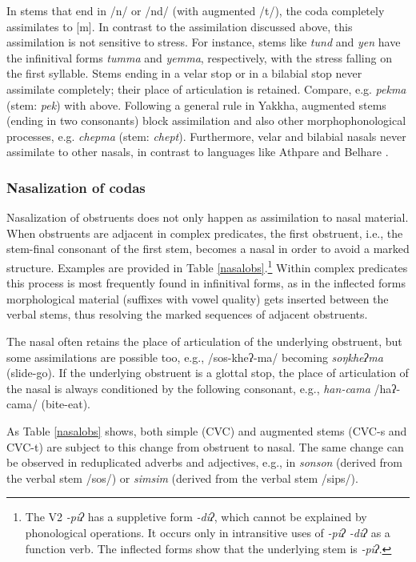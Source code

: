 In stems that end in /n/ or /nd/ (with augmented /t/), the coda completely assimilates to [m]. In contrast to the assimilation discussed above, this assimilation is not sensitive to stress. For instance, stems like \emph{tund}  and \emph{yen}  have the infinitival forms \emph{tumma} and \emph{yemma}, respectively, with the stress falling on the first syllable. Stems ending in a velar stop or in a bilabial stop never assimilate completely; their place of articulation is retained. Compare, e.g. \emph{pekma}  (stem: \emph{pek}) with \Last[b] above. Following a general rule in Yakkha, augmented stems (ending in two consonants) block assimilation and also other morphophonological processes, e.g. \emph{chepma}  (stem: \emph{chept}). Furthermore, velar and bilabial nasals never assimilate to other nasals, in contrast to languages like Athpare and  Belhare \citep{Ebert1997A-grammar, Bickel2003Belhare}.


\subsubsection{Nasalization of codas}\label{nas-cod}

Nasalization of obstruents does not only happen as assimilation to nasal material. When obstruents are adjacent in complex predicates, the first obstruent, i.e., the stem-final consonant of the first stem, becomes a nasal in order to avoid a marked structure. Examples are provided in  Table \ref{nasalobs}.\footnote{The V2 \emph{-piʔ} has a suppletive form \emph{-diʔ}, which cannot be explained by phonological operations. It occurs only in intransitive uses of \emph{-piʔ \ti -diʔ}  as a function verb. The inflected forms show that the underlying stem is \emph{-piʔ}.} Within complex predicates this process is most frequently found in infinitival forms, as in the inflected forms morphological material (suffixes with vowel quality) gets inserted between the verbal stems, thus resolving the marked sequences of adjacent obstruents.

The nasal often retains the place of articulation of the underlying obstruent, but some assimilations are possible too, e.g., /sos-kheʔ-ma/ becoming \emph{soŋkheʔma}  (slide-go). If the underlying obstruent is a glottal stop, the place of articulation of the nasal is always conditioned by the following consonant, e.g., \emph{han-cama} /haʔ-cama/  (bite-eat). 

As Table \ref{nasalobs} shows, both simple (CVC) and augmented stems (CVC-s and CVC-t) are subject to this change from obstruent to nasal. The same change can be observed in reduplicated adverbs and adjectives, e.g., in  \emph{sonson}  (derived from the verbal stem /sos/) or \emph{simsim}  (derived from the verbal stem /sips/).

